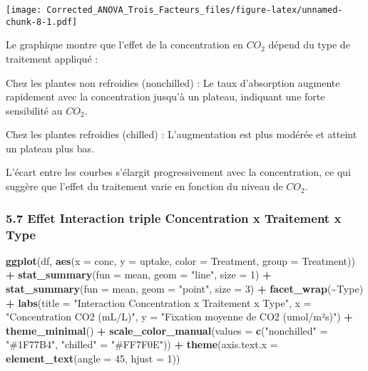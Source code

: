 \documentclass[
]{article}
\newenvironment{Shaded}{\begin{snugshade}}{\end{snugshade}}
\newcommand{\AttributeTok}[1]{\textcolor[rgb]{0.13,0.29,0.53}{#1}}
\newcommand{\DecValTok}[1]{\textcolor[rgb]{0.00,0.00,0.81}{#1}}
\newcommand{\FunctionTok}[1]{\textcolor[rgb]{0.13,0.29,0.53}{\textbf{#1}}}
\newcommand{\NormalTok}[1]{#1}
\newcommand{\OtherTok}[1]{\textcolor[rgb]{0.56,0.35,0.01}{#1}}
\newcommand{\SpecialCharTok}[1]{\textcolor[rgb]{0.81,0.36,0.00}{\textbf{#1}}}
\newcommand{\StringTok}[1]{\textcolor[rgb]{0.31,0.60,0.02}{#1}}
\begin{document}
\texttt{[image: Corrected\_ANOVA\_Trois\_Facteurs\_files/figure-latex/unnamed-chunk-8-1.pdf]}

Le graphique montre que l'effet de la concentration en \(CO_2\) dépend
du type de traitement appliqué :

Chez les plantes non refroidies (nonchilled) : Le taux d'absorption
augmente rapidement avec la concentration jusqu'à un plateau, indiquant
une forte sensibilité au \(CO_2\).

Chez les plantes refroidies (chilled) : L'augmentation est plus modérée
et atteint un plateau plus bas.

L'écart entre les courbes s'élargit progressivement avec la
concentration, ce qui suggère que l'effet du traitement varie en
fonction du niveau de \(CO_2\).

\subsubsection{5.7 Effet Interaction triple Concentration x Traitement x
Type}\label{effet-interaction-triple-concentration-x-traitement-x-type}

\begin{Shaded}
\begin{Highlighting}[]
\FunctionTok{ggplot}\NormalTok{(df, }\FunctionTok{aes}\NormalTok{(}\AttributeTok{x =}\NormalTok{ conc, }\AttributeTok{y =}\NormalTok{ uptake, }\AttributeTok{color =}\NormalTok{ Treatment, }\AttributeTok{group =}\NormalTok{ Treatment)) }\SpecialCharTok{+}
  \FunctionTok{stat\_summary}\NormalTok{(}\AttributeTok{fun =}\NormalTok{ mean, }\AttributeTok{geom =} \StringTok{"line"}\NormalTok{, }\AttributeTok{size =} \DecValTok{1}\NormalTok{) }\SpecialCharTok{+}
  \FunctionTok{stat\_summary}\NormalTok{(}\AttributeTok{fun =}\NormalTok{ mean, }\AttributeTok{geom =} \StringTok{"point"}\NormalTok{, }\AttributeTok{size =} \DecValTok{3}\NormalTok{) }\SpecialCharTok{+}
  \FunctionTok{facet\_wrap}\NormalTok{(}\SpecialCharTok{\textasciitilde{}}\NormalTok{Type) }\SpecialCharTok{+}
  \FunctionTok{labs}\NormalTok{(}\AttributeTok{title =} \StringTok{"Interaction Concentration x Traitement x Type"}\NormalTok{,}
       \AttributeTok{x =} \StringTok{"Concentration CO2 (mL/L)"}\NormalTok{, }
       \AttributeTok{y =} \StringTok{"Fixation moyenne de CO2 (umol/m²s)"}\NormalTok{) }\SpecialCharTok{+}
  \FunctionTok{theme\_minimal}\NormalTok{() }\SpecialCharTok{+}
  \FunctionTok{scale\_color\_manual}\NormalTok{(}\AttributeTok{values =} \FunctionTok{c}\NormalTok{(}\StringTok{"nonchilled"} \OtherTok{=} \StringTok{"\#1F77B4"}\NormalTok{, }\StringTok{"chilled"} \OtherTok{=} \StringTok{"\#FF7F0E"}\NormalTok{)) }\SpecialCharTok{+}
  \FunctionTok{theme}\NormalTok{(}\AttributeTok{axis.text.x =} \FunctionTok{element\_text}\NormalTok{(}\AttributeTok{angle =} \DecValTok{45}\NormalTok{, }\AttributeTok{hjust =} \DecValTok{1}\NormalTok{))}
\end{Highlighting}
\end{Shaded}
\end{document}
